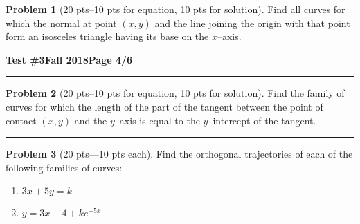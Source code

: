 \documentclass[12pt]{article}
\theoremstyle{definition}
\newtheorem{problem}{Problem}
\begin{document}
\begin{problem}[20 pts--10 pts for equation, 10 pts for solution]\label{p:isosceles}
Find all curves for which the normal at point $(x,y)$ and the line joining the origin with that point form an isosceles triangle having its base on the $x$--axis.
\vspace{11.2cm} 
\begin{flushright}
  \end{flushright}
\end{problem}

\newpage

\hfill{\large\bf Test \#3}\hfill{\large\bf Fall 2018}\hfill{\large\bf Page 4/6}\hrule

\bigskip
\begin{problem}[20 pts--10 pts for equation, 10 pts for solution]\label{p:other}
  Find the family of curves for which the length of the part of the tangent between the point of contact $(x,y)$ and the
  $y$--axis is equal to the $y$--intercept of the tangent.
  \vspace{4cm}
  \begin{flushright}
  \end{flushright}
\end{problem}
\hrule

\begin{problem}[20 pts---10 pts each]
  Find the orthogonal trajectories of each of the following families of curves:
  \begin{enumerate}
  \item $3x+5y = k$
    \vspace{3cm}
    \begin{flushright}
    \end{flushright}
  \item $y = 3x- 4 + ke^{-5x}$
    \vspace{6.5cm}
    \begin{flushright}
    \end{flushright}
  \end{enumerate}
\end{problem}
\end{document}
